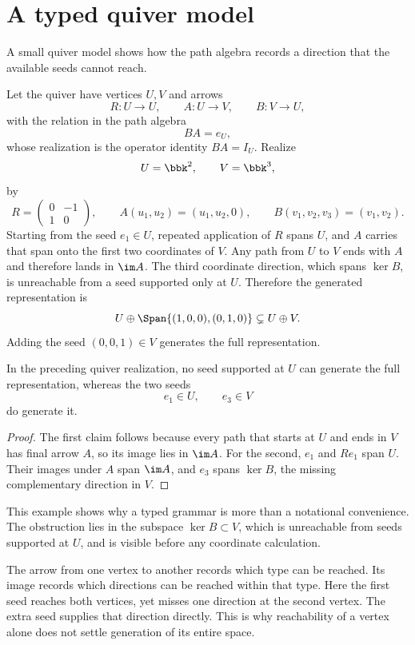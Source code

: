\section{A typed quiver model}

A small quiver model shows how the path algebra records a direction that the available seeds cannot reach.

Let the quiver have vertices $U,V$ and arrows
\[
R:U\to U,
\qquad
A:U\to V,
\qquad
B:V\to U,
\]
with the relation in the path algebra
\[
BA=e_U,
\]
whose realization is the operator identity $BA=I_U$.
Realize
\[
U=\bbk^2,
\qquad
V=\bbk^3,
\]
by
\[
R=
\begin{pmatrix}0&-1\\1&0\end{pmatrix},
\qquad
A(u_1,u_2)=(u_1,u_2,0),
\qquad
B(v_1,v_2,v_3)=(v_1,v_2).
\]
Starting from the seed $e_1\in U$, repeated application of $R$ spans $U$, and $A$ carries that span onto the first two coordinates of $V$. Any path from $U$ to $V$ ends with $A$ and therefore lands in $\im A$. The third coordinate direction, which spans $\ker B$, is unreachable from a seed supported only at $U$. Therefore the generated representation is
\[
U\oplus\Span\{(1,0,0),(0,1,0)\}
\subsetneq U\oplus V.
\]
Adding the seed $(0,0,1)\in V$ generates the full representation.

\begin{proposition}
\label{prop:typed-reachability}
In the preceding quiver realization, no seed supported at $U$ can generate the full representation, whereas the two seeds
\[
e_1\in U,
\qquad
e_3\in V
\]
do generate it.
\end{proposition}

\begin{proof}
The first claim follows because every path that starts at $U$ and ends in $V$ has final arrow $A$, so its image lies in $\im A$. For the second, $e_1$ and $Re_1$ span $U$. Their images under $A$ span $\im A$, and $e_3$ spans $\ker B$, the missing complementary direction in $V$.
\end{proof}

This example shows why a typed grammar is more than a notational convenience. The obstruction lies in the subspace $\ker B\subset V$, which is unreachable from seeds supported at $U$, and is visible before any coordinate calculation.

The arrow from one vertex to another records which type can be reached. Its image records which directions can be reached within that type. Here the first seed reaches both vertices, yet misses one direction at the second vertex. The extra seed supplies that direction directly. This is why reachability of a vertex alone does not settle generation of its entire space.


